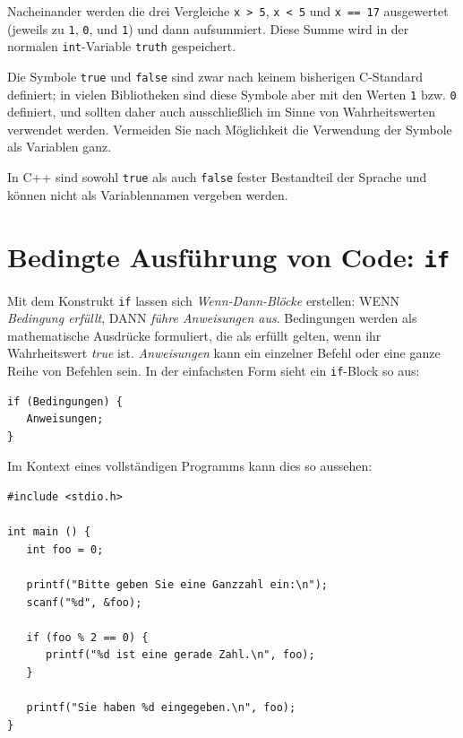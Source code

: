 Nacheinander werden die drei Vergleiche \texttt{x > 5}, \texttt{x < 5} und \texttt{x == 17} ausgewertet (jeweils zu \texttt{1}, \texttt{0}, und \texttt{1}) und dann aufsummiert. Diese Summe wird in der normalen \texttt{int}-Variable \texttt{truth} gespeichert.

\begin{warnbox}
Die Symbole \texttt{true} und \texttt{false} sind zwar nach keinem bisherigen C-Standard definiert; in vielen Bibliotheken sind diese Symbole aber mit den Werten \texttt{1} bzw. \texttt{0} definiert, und sollten daher auch ausschließlich im Sinne von Wahrheitswerten verwendet werden. Vermeiden Sie nach Möglichkeit die Verwendung der Symbole als Variablen ganz.

In C++ sind sowohl \texttt{true} als auch \texttt{false} fester Bestandteil der Sprache und können nicht als Variablennamen vergeben werden.
\end{warnbox}
\section{Bedingte Ausführung von Code: \texttt{if}}
Mit dem Konstrukt \texttt{if} lassen sich \emph{Wenn-Dann-Blöcke} erstellen: WENN \emph{Bedingung erfüllt}, DANN \emph{führe Anweisungen aus}. Bedingungen werden als mathematische Ausdrücke formuliert, die als erfüllt gelten, wenn ihr Wahrheitswert \emph{true} ist. \emph{Anweisungen} kann ein einzelner Befehl oder eine ganze Reihe von Befehlen sein. In der einfachsten Form sieht ein \texttt{if}-Block so aus:

\begin{codebox}
\begin{verbatim}
if (Bedingungen) {
   Anweisungen;
}
\end{verbatim}
\end{codebox}

Im Kontext eines vollständigen Programms kann dies so aussehen:

\begin{codebox}
\begin{verbatim}
#include <stdio.h>

int main () {
   int foo = 0;
   
   printf("Bitte geben Sie eine Ganzzahl ein:\n");
   scanf("%d", &foo);
   
   if (foo % 2 == 0) {
      printf("%d ist eine gerade Zahl.\n", foo);
   }
   
   printf("Sie haben %d eingegeben.\n", foo);
}
\end{verbatim}
\end{codebox}

